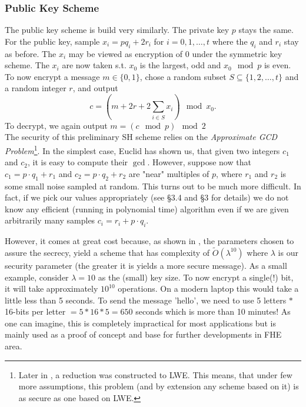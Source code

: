 \subsubsection*{Public Key Scheme}
The public key scheme is build very similarly. The private key $p$ stays the same. For the public key, sample $x_i = p q_i + 2r_i$ for $i = 0, 1, \dots, t$ where the $q_i$ and $r_i$ stay as before. The $x_i$ may be viewed as encryption of 0 under the symmetric key scheme. The $x_i$ are now taken s.t. $x_0$ is the largest, odd and $x_0 \mod p$ is even. To now encrypt a message $m \in \{0,1\}$, chose a random subset $S \subseteq \{1, 2, \dots, t\}$ and a random integer $r$, and output
\begin{equation} c = (m + 2r + 2\sum_{i \in S} x_i) \mod x_0.\end{equation}
To decrypt, we again output $m = (c \mod p) \mod 2$ \\

The security of this preliminary SH scheme relies on the \textit{Approximate GCD Problem}\footnote{Later in \cite{revisited}, a reduction was constructed to LWE. This means, that under few more assumptions, this problem (and by extension any scheme based on it) is as secure as one based on LWE.}. In the simplest case, Euclid has shown us, that given two integers $c_1$ and $c_2$, it is easy to compute their $\gcd$. However, suppose now that $c_1 = p \cdot q_1 + r_1$ and $c_2 = p \cdot q_2 + r_2$ are "near" multiples of $p$, where $r_1$ and $r_2$ is some small noise sampled at random. This turns out to be much more difficult. In fact, if we pick our values appropriately (see \cite{easy_fhe} \S 3.4 and \cite{int_scheme} \S 3 for details) we do not know any efficient (running in polynomial time) algorithm even if we are given arbitrarily many samples $c_i = r_i + p \cdot q_i$.

However, it comes at great cost because, as shown in \cite{int_scheme}, the parameters chosen to assure the secrecy, yield a scheme that has complexity of $\tilde{O}(\lambda^{10})$ where $\lambda$ is our security parameter (the greater it is yields a more secure message). As a small example, consider $\lambda = 10$ as the (small) key size. To now encrypt a single(!) bit, it will take approximately $10^{10}$ operations. On a modern laptop this would take a little less than 5 seconds. To send the message 'hello', we need to use 5 letters $*$ 16-bits per letter $= 5*16*5 = 650$ seconds which is more than 10 minutes! As one can imagine, this is completely impractical for most applications but is mainly used as a proof of concept and base for further developments in FHE area.

